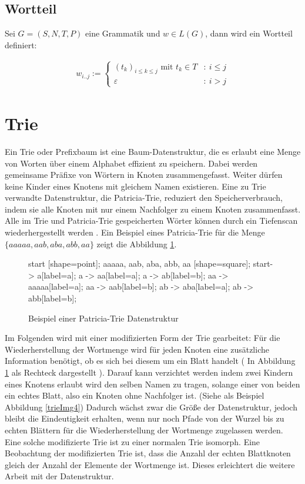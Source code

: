 \documentclass[a4paper,12pt]{report}
\begin{document}
\subsection*{Wortteil}

Sei $G=(S,N,T,P)$ eine Grammatik und $w\in L(G)$, dann wird ein Wortteil definiert: 

\begin{eqnarray}
  w_{i..j} := 
  \begin{cases}
    (t_k)_{i\leq k \leq j}\text{ mit }t_k\in T &:\ i\leq j \\
    \varepsilon &:\ i>j
  \end{cases}
\end{eqnarray}

\section{Trie}
\label{trie}

Ein Trie oder Prefixbaum ist eine Baum-Datenstruktur, die es erlaubt eine Menge von Worten über einem Alphabet effizient zu speichern. Dabei werden gemeinsame Präfixe von Wörtern in Knoten zusammengefasst. Weiter dürfen keine Kinder eines Knotens mit gleichem Namen existieren. 
Eine zu Trie verwandte Datenstruktur, die Patricia-Trie, reduziert den Speicherverbrauch, indem sie alle Knoten mit nur einem Nachfolger zu einem Knoten zusammenfasst.
Alle im Trie und Patricia-Trie gespeicherten Wörter können durch ein Tiefenscan wiederhergestellt werden \cite{Morrison1968}.
Ein Beispiel eines Patricia-Trie für die Menge $\{ aaaaa, aab, aba, abb, aa \}$ zeigt die Abbildung \ref{trieImg}.

\begin{figure}[ht]
    \centering
    {
      start [shape=point];
      aaaaa, aab, aba, abb, aa [shape=square];
      start-> a[label=a];
      a -> aa[label=a];
      a -> ab[label=b];
      aa -> aaaaa[label=a];
      aa -> aab[label=b];
      ab -> aba[label=a];
      ab -> abb[label=b];
    }
    \caption{Beispiel einer Patricia-Trie Datenstruktur}
    \label{trieImg}
\end{figure}

Im Folgenden wird mit einer modifizierten Form der Trie gearbeitet: 
Für die Wiederherstellung der Wortmenge wird für jeden Knoten eine zusätzliche Information benötigt, ob es sich bei diesem um ein Blatt handelt ( In Abbildung \ref{trieImg} als Rechteck dargestellt ). 
Darauf kann verzichtet werden indem zwei Kindern eines Knotens erlaubt wird den selben Namen zu tragen, solange einer von beiden ein echtes Blatt, also ein Knoten ohne Nachfolger ist. (Siehe als Beispiel Abbildung \ref{trieImg4})
Dadurch wächst zwar die Größe der Datenstruktur, jedoch bleibt die Eindeutigkeit erhalten, wenn nur noch Pfade von der Wurzel bis zu echten Blättern für die Wiederherstellung der Wortmenge zugelassen werden.
Eine solche modifizierte Trie ist zu einer normalen Trie isomorph.
Eine Beobachtung der modifizierten Trie ist, dass die Anzahl der echten Blattknoten gleich der Anzahl der Elemente der Wortmenge ist. Dieses erleichtert die weitere Arbeit mit der Datenstruktur.
\end{document}
